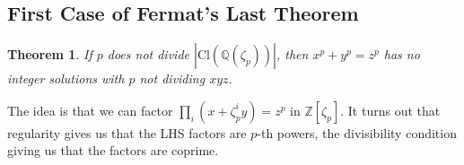 \documentclass[letterpaper, 12pt]{article}
\newtheorem{thm}{Theorem}[subsection]
\newcommand{\cl}[1]{{\mathrm{Cl}(#1)}}
\newcommand{\rats}{\mathbb{Q}}
\begin{document}
\subsection{First Case of Fermat's Last Theorem}
\begin{thm}
If $p$ does not divide $|\cl {\rats(\zeta_p)}|$, then $x^p + y^p = z^p$ has no integer solutions with $p$ not dividing $xyz$.
\end{thm}

The idea is that we can factor $\prod_i (x + \zeta_p^i y) = z^p$ in $\mathbb{Z}[\zeta_p]$. It turns out that regularity gives us that the LHS factors are $p$-th powers, the divisibility condition giving us that the factors are coprime. 
\end{document}
